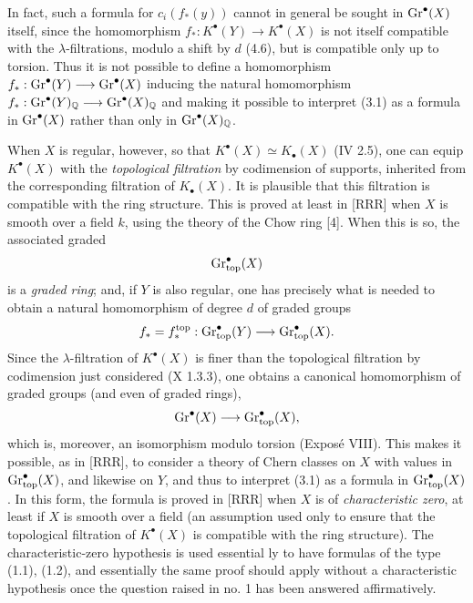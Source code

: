In fact, such a formula for $c_i(f_*(y))$ cannot in general be sought in $\operatorname{Gr}^\bullet(X)$ itself, since the homomorphism $f_*:K^\bullet(Y)\longrightarrow K^\bullet(X)$ is not itself compatible with the $\lambda$-filtrations, modulo a shift by $d$ (4.6), but is compatible only up to torsion. Thus it is not possible to define a homomorphism $f_*:\operatorname{Gr}^\bullet(Y)\longrightarrow\operatorname{Gr}^\bullet(X)$ inducing the natural homomorphism $f_*:\operatorname{Gr}^\bullet(Y)_{\mathbb Q}\longrightarrow\operatorname{Gr}^\bullet(X)_{\mathbb Q}$ and making it possible to interpret (3.1) as a formula in $\operatorname{Gr}^\bullet(X)$ rather than only in $\operatorname{Gr}^\bullet(X)_{\mathbb Q}$.

When $X$ is regular, however, so that $K^\bullet(X)\simeq K_\bullet(X)$ (IV 2.5), one can equip $K^\bullet(X)$ with the \emph{topological filtration} by codimension of supports, inherited from the corresponding filtration of $K_\bullet(X)$. It is plausible that this filtration is compatible with the ring structure. This is proved at least in [RRR] when $X$ is smooth over a field $k$, using the theory of the Chow ring [4]. When this is so, the associated graded
\[
  \operatorname{Gr}_{\mathrm{top}}^\bullet(X)
\]
is a \emph{graded ring}; and, if $Y$ is also regular, one has precisely what is needed to obtain a natural homomorphism of degree $d$ of graded groups
\[
  f_*=f_*^{\mathrm{top}}:\operatorname{Gr}_{\mathrm{top}}^\bullet(Y)
  \longrightarrow\operatorname{Gr}_{\mathrm{top}}^\bullet(X).
\]
Since the $\lambda$-filtration of $K^\bullet(X)$ is finer than the topological filtration by codimension just considered (X 1.3.3), one obtains a canonical homomorphism of graded groups (and even of graded rings),
\[
  \operatorname{Gr}^\bullet(X)\longrightarrow\operatorname{Gr}_{\mathrm{top}}^\bullet(X),
\]
which is, moreover, an isomorphism modulo torsion (Expos\'e VIII). This makes it possible, as in [RRR], to consider a theory of Chern classes on $X$ with values in $\operatorname{Gr}_{\mathrm{top}}^\bullet(X)$, and likewise on $Y$, and thus to interpret (3.1) as a formula in $\operatorname{Gr}_{\mathrm{top}}^\bullet(X)$. In this form, the formula is proved in [RRR] when $X$ is of \emph{characteristic zero}, at least if $X$ is smooth over a field (an assumption used only to ensure that the topological filtration of $K^\bullet(X)$ is compatible with the ring structure). The characteristic-zero hypothesis is used essential%
ly to have formulas of the type (1.1), (1.2), and essentially the same proof should apply without a characteristic hypothesis once the question raised in no. 1 has been answered affirmatively.

